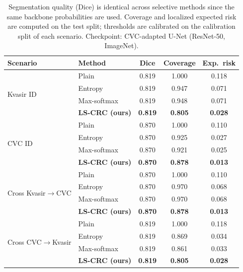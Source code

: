 
\begin{table}[t]
  \centering
  \caption{Segmentation quality (Dice) is identical across selective methods since the same backbone probabilities are used. Coverage and localized expected risk are computed on the test split; thresholds are calibrated on the calibration split of each scenario. Checkpoint: CVC-adapted U-Net (ResNet-50, ImageNet).}
  \label{tab:main-alpha005}
  \small
  \begin{tabular}{@{}llccc@{}}
    \toprule
    Scenario & Method & Dice & Coverage & Exp.\ risk \\
    \midrule
    \multirow{4}{*}{Kvasir ID}
      & Plain & 0.819 & 1.000 & 0.118 \\
      & Entropy & 0.819 & 0.947 & 0.071 \\
      & Max-softmax & 0.819 & 0.948 & 0.071 \\
      & \textbf{LS-CRC (ours)} & \textbf{0.819} & \textbf{0.805} & \textbf{0.028} \\
    \midrule
    \multirow{4}{*}{CVC ID}
      & Plain & 0.870 & 1.000 & 0.110 \\
      & Entropy & 0.870 & 0.925 & 0.027 \\
      & Max-softmax & 0.870 & 0.921 & 0.025 \\
      & \textbf{LS-CRC (ours)} & \textbf{0.870} & \textbf{0.878} & \textbf{0.013} \\
    \midrule
    \multirow{4}{*}{Cross Kvasir$\rightarrow$CVC}
      & Plain & 0.870 & 1.000 & 0.110 \\
      & Entropy & 0.870 & 0.970 & 0.068 \\
      & Max-softmax & 0.870 & 0.970 & 0.068 \\
      & \textbf{LS-CRC (ours)} & \textbf{0.870} & \textbf{0.878} & \textbf{0.013} \\
    \midrule
    \multirow{4}{*}{Cross CVC$\rightarrow$Kvasir}
      & Plain & 0.819 & 1.000 & 0.118 \\
      & Entropy & 0.819 & 0.869 & 0.034 \\
      & Max-softmax & 0.819 & 0.861 & 0.033 \\
      & \textbf{LS-CRC (ours)} & \textbf{0.819} & \textbf{0.805} & \textbf{0.028} \\
    \bottomrule
  \end{tabular}
\end{table}
